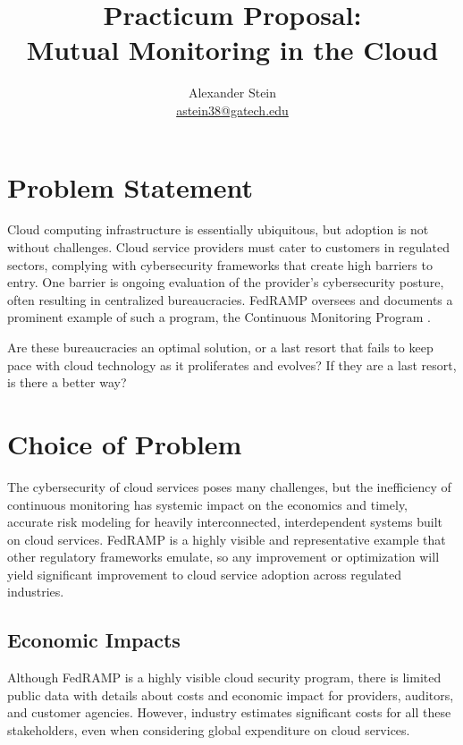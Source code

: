 \documentclass{jdf}
\begin{document}
\title{Practicum Proposal: \\ Mutual Monitoring in the Cloud}
\author{Alexander Stein \\ \href{mailto:astein38@gatech.edu}{astein38@gatech.edu}}

\maketitle
\thispagestyle{fancy}

\section{Problem Statement}

Cloud computing infrastructure is essentially ubiquitous, but adoption is not without challenges. Cloud service providers must cater to customers in regulated sectors, complying with cybersecurity frameworks that create high barriers to entry. One barrier is ongoing evaluation of the provider's cybersecurity posture, often resulting in centralized bureaucracies. FedRAMP oversees and documents a prominent example of such a program, the Continuous Monitoring Program \citeyear[p.~14]{fedramp_auth_playbook25}.

Are these bureaucracies an optimal solution, or a last resort that fails to keep pace with cloud technology as it proliferates and evolves? If they are a last resort, is there a better way?

\section{Choice of Problem}

The cybersecurity of cloud services poses many challenges, but the inefficiency of continuous monitoring has systemic impact on the economics and timely, accurate risk modeling for heavily interconnected, interdependent systems built on cloud services. FedRAMP is a highly visible and representative example that other regulatory frameworks emulate, so any improvement or optimization will yield significant improvement to cloud service adoption across regulated industries.

\subsection{Economic Impacts}

Although FedRAMP is a highly visible cloud security program, there is limited public data with details about costs and economic impact for providers, auditors, and customer agencies. However, industry estimates significant costs for all these stakeholders, even when considering global expenditure on cloud services.
\end{document}
